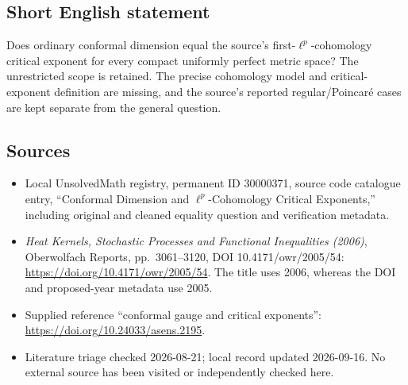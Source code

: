 \documentclass[11pt]{article}
\begin{document}
\subsection{Short English statement}
Does ordinary conformal dimension equal the source's first-\(\ell^p\)-cohomology critical exponent for every compact uniformly perfect metric space? The unrestricted scope is retained. The precise cohomology model and critical-exponent definition are missing, and the source's reported regular/Poincar\'e cases are kept separate from the general question.
\subsection{Sources}
\begin{itemize}
\item Local UnsolvedMath registry, permanent ID 30000371, source code catalogue entry, ``Conformal Dimension and \(\ell^p\)-Cohomology Critical Exponents,'' including original and cleaned equality question and verification metadata.
\item \emph{Heat Kernels, Stochastic Processes and Functional Inequalities (2006)}, Oberwolfach Reports, pp.\ 3061--3120, DOI 10.4171/owr/2005/54: \url{https://doi.org/10.4171/owr/2005/54}. The title uses 2006, whereas the DOI and proposed-year metadata use 2005.
\item Supplied reference ``conformal gauge and critical exponents'': \url{https://doi.org/10.24033/asens.2195}.
\item Literature triage checked 2026-08-21; local record updated 2026-09-16. No external source has been visited or independently checked here.
\end{itemize}
\end{document}
